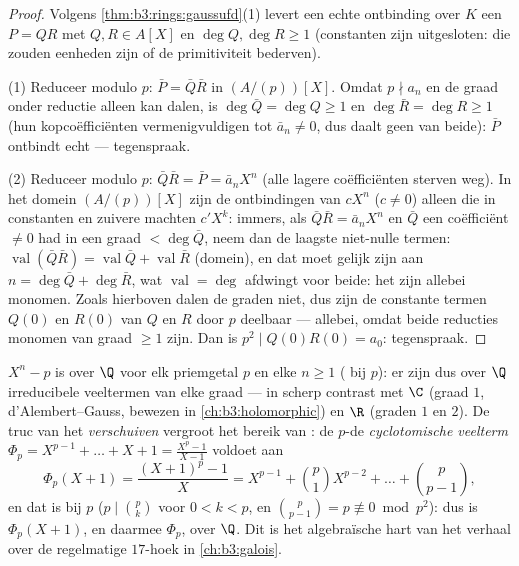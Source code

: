 \begin{proof}
Volgens \cref{thm:b3:rings:gaussufd}(1) levert een echte
ontbinding over $K$ een $P = QR$ met $Q, R \in A[X]$ en $\deg Q,
\deg R \geq 1$ (constanten zijn uitgesloten: die zouden eenheden
zijn of de primitiviteit bederven).

(1) Reduceer modulo $p$: $\bar P = \bar Q\bar R$ in $(A/(p))[X]$.
Omdat $p \nmid a_n$ en de graad onder reductie alleen kan dalen, is
$\deg \bar Q = \deg Q \geq 1$ en $\deg\bar R = \deg R \geq 1$ (hun
kopcoëfficiënten vermenigvuldigen tot $\bar a_n \neq 0$, dus daalt
geen van beide): $\bar P$ ontbindt echt --- tegenspraak.

(2) Reduceer modulo $p$: $\bar Q \bar R = \bar P = \bar a_n X^n$
(alle lagere coëfficiënten sterven weg). In het domein
$(A/(p))[X]$ zijn de ontbindingen van $cX^n$ ($c \ne 0$) alleen
die in constanten en zuivere machten $c'X^k$: immers, als $\bar
Q\bar R = \bar a_nX^n$ en $\bar Q$ een coëfficiënt $\neq 0$ had in
een graad $< \deg\bar Q$, neem dan de laagste niet-nulle termen:
$\operatorname{val}(\bar Q\bar R) = \operatorname{val}\bar Q +
\operatorname{val}\bar R$ (domein), en dat moet gelijk zijn aan $n
= \deg\bar Q + \deg\bar R$, wat $\operatorname{val} = \deg$
afdwingt voor beide: het zijn allebei monomen. Zoals hierboven
dalen de graden niet, dus zijn de constante termen $Q(0)$ en
$R(0)$ van $Q$ en $R$ door $p$ deelbaar --- allebei, omdat beide
reducties monomen van graad $\geq 1$ zijn. Dan is $p^2 \mid
Q(0)R(0) = a_0$: tegenspraak.
\end{proof}

\begin{example}\label{ex:b3:rings:eisenstein}
$X^n - p$ is  over $\Q$ voor elk priemgetal $p$ en elke
$n \geq 1$ ( bij $p$): er zijn dus over $\Q$
irreducibele veeltermen van elke graad --- in scherp contrast met
$\C$ (graad $1$, d'Alembert--Gauss, bewezen in
\cref{ch:b3:holomorphic}) en $\R$ (graden $1$ en $2$). De truc van
het \emph{verschuiven} vergroot het bereik van : de
$p$-de \emph{cyclotomische veelterm}
$\Phi_p = X^{p-1} + \dots + X + 1 = \frac{X^p - 1}{X - 1}$ voldoet
aan
\[
\Phi_p(X + 1) = \frac{(X+1)^p - 1}{X}
= X^{p-1} + \binom{p}{1}X^{p-2} + \dots + \binom{p}{p-1},
\]
en dat is  bij $p$ ($p \mid \binom pk$ voor $0 < k < p$,
en $\binom{p}{p-1} = p \not\equiv 0 \bmod p^2$): dus is
$\Phi_p(X+1)$, en daarmee $\Phi_p$,  over $\Q$. Dit is
het algebraïsche hart van het verhaal over de regelmatige
$17$-hoek in \cref{ch:b3:galois}.
\end{example}

